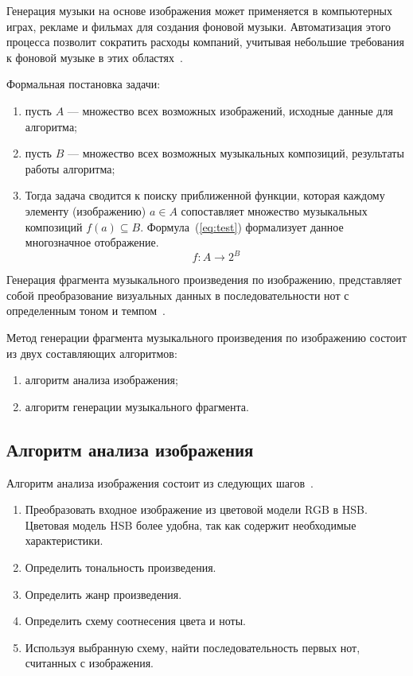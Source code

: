 Генерация музыки на основе изображения может применяется в компьютерных играх, рекламе и фильмах для создания фоновой музыки. 
Автоматизация этого процесса позволит сократить расходы компаний, учитывая небольшие требования к фоновой музыке в этих областях~\cite{actuality}.


Формальная постановка задачи: 
\begin{enumerate}
	\item пусть $A$ --- множество всех возможных изображений, исходные данные для алгоритма;
	\item пусть $B$ --- множество всех возможных музыкальных композиций, результаты работы алгоритма;
	\item Тогда задача сводится к поиску приближенной функции, которая каждому элементу (изображению) $a \in A$ сопоставляет множество музыкальных композиций $f(a) \subseteq B$. Формула~(\ref{eq:test}) формализует данное многозначное отображение.
	\begin{equation}
		f: A \rightarrow 2^B 
		\label{eq:test}
	\end{equation}
\end{enumerate}



Генерация фрагмента музыкального произведения по изображению, представляет собой преобразование визуальных данных в последовательности нот с определенным тоном и темпом~\cite{alg}. 

Метод генерации фрагмента музыкального произведения по изображению состоит из двух составляющих алгоритмов: 
\begin{enumerate}
	\item алгоритм анализа изображения; %
	\item алгоритм генерации музыкального фрагмента.
\end{enumerate}	

\subsection{Алгоритм анализа изображения}

Алгоритм анализа изображения состоит из следующих шагов~\cite{alg}.
\begin{enumerate}
	\item Преобразовать входное изображение из цветовой модели RGB в HSB.
	Цветовая модель HSB более удобна, так как содержит необходимые характеристики.
	\item Определить тональность произведения.
	\item Определить жанр произведения.
	\item Определить схему соотнесения цвета и ноты.
	\item Используя выбранную схему, найти последовательность первых нот, считанных с
	изображения.
\end{enumerate}


